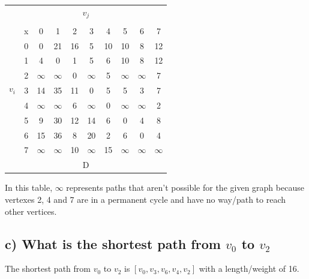 \documentclass[11pt]{article}
\begin{document}
\begin{center}
\begin{tabular} {c c | c c c c c c c c}
	\multicolumn{10}{c}{$v_j$} \\
	\multirow{10}{*}{$v_i$} \\
	& x & 0 & 1 & 2 & 3 & 4 & 5 & 6 & 7 \\
	\hline
	& 0 & 0 & 21 & 16 & 5 & 10 & 10 & 8 & 12 \\
	& 1 & 4 & 0 & 1 & 5 & 6 & 10 & 8 & 12 \\
	& 2 & $\infty$ & $\infty$ & 0 & $\infty$ & 5 & $\infty$ & $\infty$ & 7 \\
	& 3 & 14 & 35 & 11 & 0 & 5 & 5 & 3 & 7 \\
	& 4 & $\infty$ & $\infty$ & 6 & $\infty$ & 0 & $\infty$ & $\infty$ & 2 \\
	& 5 & 9 & 30 & 12 & 14 & 6 & 0 & 4 & 8 \\
	& 6 & 15 & 36 & 8 & 20 & 2 & 6 & 0 & 4 \\
	& 7 & $\infty$ & $\infty$ & 10 & $\infty$ & 15 & $\infty$ & $\infty$ & $\infty$ \\[0.2cm]
	\multicolumn{10}{c}{D} \\ 
\end{tabular}
\end{center}

\bigskip
\noindent In this table, $\infty$ represents paths that aren't possible for the given graph because vertexes 2, 4 and 7 are in a permanent cycle and have no way/path to reach other vertices.



\subsection*{c) What is the shortest path from $v_0$ to $v_2$}

\noindent The shortest path from $v_0$ to $v_2$ is $[v_0, v_3, v_6, v_4, v_2]$ with a length/weight of 16.













\end{document}

